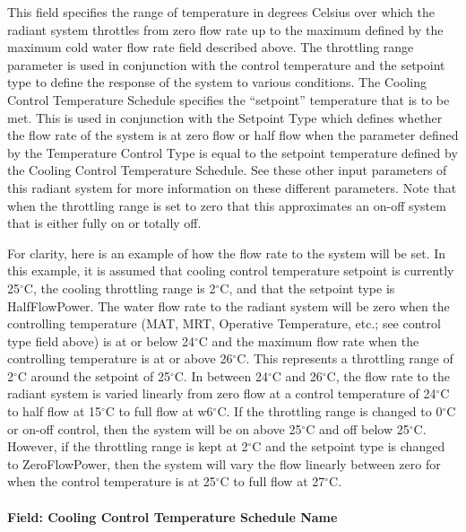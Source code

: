 This field specifies the range of temperature in degrees Celsius over which the radiant system throttles from zero flow rate up to the maximum defined by the maximum cold water flow rate field described above. The throttling range parameter is used in conjunction with the control temperature and the setpoint type to define the response of the system to various conditions. The Cooling Control Temperature Schedule specifies the ``setpoint'' temperature that is to be met.  This is used in conjunction with the Setpoint Type which defines whether the flow rate of the system is at zero flow or half flow when the parameter defined by the Temperature Control Type is equal to the setpoint temperature defined by the Cooling Control Temperature Schedule.  See these other input parameters of this radiant system for more information on these different parameters.  Note that when the throttling range is set to zero that this approximates an on-off system that is either fully on or totally off.

For clarity, here is an example of how the flow rate to the system will be set.  In this example, it is assumed that cooling control temperature setpoint is currently 25$^\circ$C, the cooling throttling range is 2$^\circ$C, and that the setpoint type is HalfFlowPower.  The water flow rate to the radiant system will be zero when the controlling temperature (MAT, MRT, Operative Temperature, etc.; see control type field above) is at or below 24$^\circ$C and the maximum flow rate when the controlling temperature is at or above 26$^\circ$C. This represents a throttling range of 2$^\circ$C around the setpoint of 25$^\circ$C. In between 24$^\circ$C and 26$^\circ$C, the flow rate to the radiant system is varied linearly from zero flow at a control temperature of 24$^\circ$C to half flow at 15$^\circ$C to full flow at w6$^\circ$C.  If the throttling range is changed to 0$^\circ$C or on-off control, then the system will be on above 25$^\circ$C and off below 25$^\circ$C.  However, if the throttling range is kept at 2$^\circ$C and the setpoint type is changed to ZeroFlowPower, then the system will vary the flow linearly between zero for when the control temperature is at 25$^\circ$C to full flow at 27$^\circ$C.

\paragraph{Field: Cooling Control Temperature Schedule Name}\label{field-cooling-control-temperature-schedule-name}

